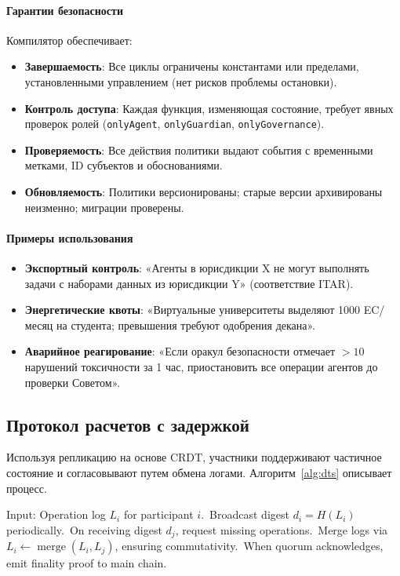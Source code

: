 \documentclass[11pt]{article}
\begin{document}
\paragraph{Гарантии безопасности} Компилятор обеспечивает:
\begin{itemize}[noitemsep]
  \item \textbf{Завершаемость}: Все циклы ограничены константами или пределами, установленными управлением (нет рисков проблемы остановки).
  \item \textbf{Контроль доступа}: Каждая функция, изменяющая состояние, требует явных проверок ролей (\texttt{onlyAgent}, \texttt{onlyGuardian}, \texttt{onlyGovernance}).
  \item \textbf{Проверяемость}: Все действия политики выдают события с временными метками, ID субъектов и обоснованиями.
  \item \textbf{Обновляемость}: Политики версионированы; старые версии архивированы неизменно; миграции проверены.
\end{itemize}

\paragraph{Примеры использования}
\begin{itemize}[noitemsep]
  \item \textbf{Экспортный контроль}: «Агенты в юрисдикции X не могут выполнять задачи с наборами данных из юрисдикции Y» (соответствие ITAR).
  \item \textbf{Энергетические квоты}: «Виртуальные университеты выделяют 1000 EC/месяц на студента; превышения требуют одобрения декана».
  \item \textbf{Аварийное реагирование}: «Если оракул безопасности отмечает $>10$ нарушений токсичности за 1 час, приостановить все операции агентов до проверки Советом».
\end{itemize}

\subsection{Протокол расчетов с задержкой}
Используя репликацию на основе CRDT, участники поддерживают частичное состояние и согласовывают путем обмена логами. Алгоритм~\ref{alg:dts} описывает процесс.

\begin{algorithm}[H]
  \caption{Delay-Tolerant Settlement (DTS)}
  \label{alg:dts}
  \begin{algorithmic}[1]
    \STATE Input: Operation log $L_i$ for participant $i$.\
    \STATE Broadcast digest $d_i = H(L_i)$ periodically.\
    \STATE On receiving digest $d_j$, request missing operations.\
    \STATE Merge logs via $L_i \leftarrow \operatorname{merge}(L_i, L_j)$, ensuring commutativity.\
    \STATE When quorum acknowledges, emit finality proof to main chain.\
  \end{algorithmic}
\end{algorithm}
\end{document}
